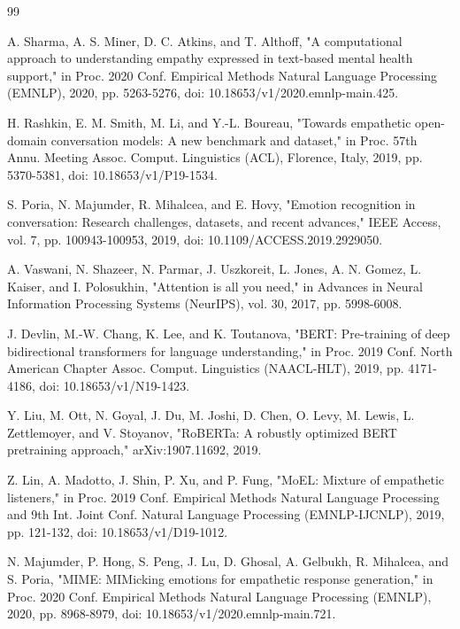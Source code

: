 \begin{thebibliography}{99}

A. Sharma, A. S. Miner, D. C. Atkins, and T. Althoff, "A computational approach to understanding empathy expressed in text-based mental health support," in Proc. 2020 Conf. Empirical Methods Natural Language Processing (EMNLP), 2020, pp. 5263-5276, doi: 10.18653/v1/2020.emnlp-main.425.

H. Rashkin, E. M. Smith, M. Li, and Y.-L. Boureau, "Towards empathetic open-domain conversation models: A new benchmark and dataset," in Proc. 57th Annu. Meeting Assoc. Comput. Linguistics (ACL), Florence, Italy, 2019, pp. 5370-5381, doi: 10.18653/v1/P19-1534.

S. Poria, N. Majumder, R. Mihalcea, and E. Hovy, "Emotion recognition in conversation: Research challenges, datasets, and recent advances," IEEE Access, vol. 7, pp. 100943-100953, 2019, doi: 10.1109/ACCESS.2019.2929050.

A. Vaswani, N. Shazeer, N. Parmar, J. Uszkoreit, L. Jones, A. N. Gomez, L. Kaiser, and I. Polosukhin, "Attention is all you need," in Advances in Neural Information Processing Systems (NeurIPS), vol. 30, 2017, pp. 5998-6008.

J. Devlin, M.-W. Chang, K. Lee, and K. Toutanova, "BERT: Pre-training of deep bidirectional transformers for language understanding," in Proc. 2019 Conf. North American Chapter Assoc. Comput. Linguistics (NAACL-HLT), 2019, pp. 4171-4186, doi: 10.18653/v1/N19-1423.

Y. Liu, M. Ott, N. Goyal, J. Du, M. Joshi, D. Chen, O. Levy, M. Lewis, L. Zettlemoyer, and V. Stoyanov, "RoBERTa: A robustly optimized BERT pretraining approach," arXiv:1907.11692, 2019.

Z. Lin, A. Madotto, J. Shin, P. Xu, and P. Fung, "MoEL: Mixture of empathetic listeners," in Proc. 2019 Conf. Empirical Methods Natural Language Processing and 9th Int. Joint Conf. Natural Language Processing (EMNLP-IJCNLP), 2019, pp. 121-132, doi: 10.18653/v1/D19-1012.

N. Majumder, P. Hong, S. Peng, J. Lu, D. Ghosal, A. Gelbukh, R. Mihalcea, and S. Poria, "MIME: MIMicking emotions for empathetic response generation," in Proc. 2020 Conf. Empirical Methods Natural Language Processing (EMNLP), 2020, pp. 8968-8979, doi: 10.18653/v1/2020.emnlp-main.721.


\end{thebibliography}
